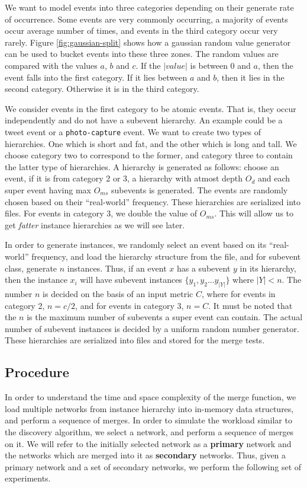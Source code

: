 We want to model events into three categories depending on their generate rate of occurrence. Some events are very commonly occurring, a majority of events occur average number of times, and events in the third category occur very rarely. Figure \ref{fig:gaussian-split} shows how a gaussian random value generator can be used to bucket events into these three zones. The random values are compared with the values $a$, $b$ and $c$. If the $|value|$ is between 0 and $a$, then the event falls into the first category. If it lies between $a$ and $b$, then it lies in the second category. Otherwise it is in the third category.

We consider events in the first category to be atomic events. That is, they occur independently and do not have a subevent hierarchy. An example could be a tweet event or a \texttt{photo-capture} event. We want to create two types of hierarchies. One which is short and fat, and the other which is long and tall. We choose category two to correspond to the former, and category three to contain the latter type of hierarchies. A hierarchy is generated as follows: choose an event, if it is from category 2 or 3, a hierarchy with atmost depth $O_d$ and each super event having max $O_{ms}$ subevents is generated. The events are randomly chosen based on their ``real-world'' frequency. These hierarchies are serialized into files. For events in category 3, we double the value of $O_{ms}$. This will allow us to get \textit{fatter} instance hierarchies as we will see later.

In order to generate instances, we randomly select an event based on its ``real-world'' frequency, and load the hierarchy structure from the file, and for subevent class, generate $n$ instances. Thus, if an event $x$ has a subevent $y$ in its hierarchy, then the instance $x_i$ will have subevent instances $\{y_1, y_2 ... y_{|Y|}\}$ where $|Y| < n$. The number $n$ is decided on the basis of an input metric $C$, where for events in category 2, $n = c/2$, and for events in category 3, $n = C$. It must be noted that the $n$ is the maximum number of subevents a super event can contain. The actual number of subevent instances is decided by a uniform random number generator. These hierarchies are serialized into files and stored for the merge tests.

\subsection{Procedure}
In order to understand the time and space complexity of the merge function, we load multiple networks from instance hierarchy into in-memory data structures, and perform a sequence of merges. In order to simulate the workload similar to the discovery algorithm, we select a network, and perform a sequence of merges on it. We will refer to the initially selected network as a \textbf{primary} network and the networks which are merged into it as \textbf{secondary} networks. Thus, given a primary network and a set of secondary networks, we perform the following set of experiments.

